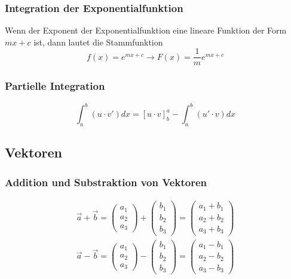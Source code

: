 \subsubsection{Integration der Exponentialfunktion}
\label{ssub:integration_der_exponentialfunktion}

Wenn der Exponent der Exponentialfunktion eine lineare Funktion der Form $mx+c$ ist, dann lautet die Stammfunktion
\begin{equation}
	f(x) = e^{mx+c} \rightarrow F(x) = \frac{1}{m} e^{mx+c}
\end{equation}

\subsubsection{Partielle Integration}
\label{ssub:partielle_integration}
\begin{equation}
	\int_a^b (u \cdot v') dx = \left[u \cdot v \right]^a_b - \int_a^b (u' \cdot v) dx
\end{equation}

\subsection{Vektoren} 
\label{sub:vektoren}

\subsubsection{Addition und Substraktion von Vektoren} 
\label{ssub:addition_und_substraktion_von_vektoren}

\begin{eqnarray}
	\overrightarrow{a} + \overrightarrow{b}
	= \left( \begin{array}{c} a_1\\a_2\\a_3\end{array}\right) + \left( \begin{array}{c} b_1\\b_2\\b_3\end{array}\right)
	= \left( \begin{array}{c} a_1 + b_1\\a_2 + b_2\\a_3 + b_3\end{array}\right) \\
	\overrightarrow{a} - \overrightarrow{b}
	= \left( \begin{array}{c} a_1\\a_2\\a_3\end{array}\right) - \left( \begin{array}{c} b_1\\b_2\\b_3\end{array}\right)
	= \left( \begin{array}{c} a_1 - b_1\\a_2 - b_2\\a_3 - b_3\end{array}\right)
\end{eqnarray}

